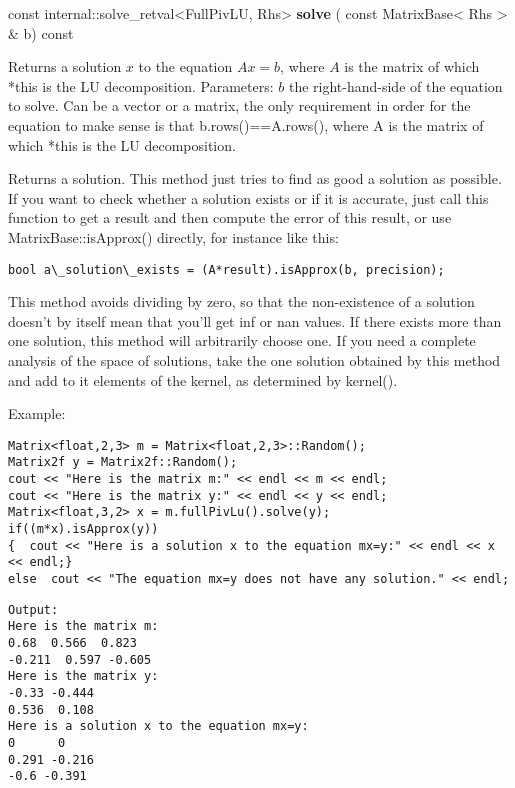 \vspace{0.3cm}
const internal::solve\_retval<FullPivLU, Rhs> \textbf{solve}  ( const MatrixBase< Rhs > \&  b)  const 

Returns a solution $x$ to the equation $Ax=b$, where $A$ is the matrix of which *this is the LU decomposition.
Parameters: $b$ the right-hand-side of the equation to solve. Can be a vector or a matrix, the only requirement in order for the equation to make sense is that b.rows()==A.rows(), where A is the matrix of which *this is the LU decomposition. 

Returns a solution. This method just tries to find as good a solution as possible. If you want to check whether a solution exists or if it is accurate, just call this function to get a result and then compute the error of this result, or use MatrixBase::isApprox() directly, for instance like this:

\begin{verbatim}
bool a\_solution\_exists = (A*result).isApprox(b, precision); 
\end{verbatim}

This method avoids dividing by zero, so that the non-existence of a solution doesn't by itself mean that you'll get inf or nan values.
If there exists more than one solution, this method will arbitrarily choose one. If you need a complete analysis of the space of solutions, take the one solution obtained by this method and add to it elements of the kernel, as determined by kernel().



Example:
\begin{lstlisting}
Matrix<float,2,3> m = Matrix<float,2,3>::Random();
Matrix2f y = Matrix2f::Random();
cout << "Here is the matrix m:" << endl << m << endl;
cout << "Here is the matrix y:" << endl << y << endl;
Matrix<float,3,2> x = m.fullPivLu().solve(y);
if((m*x).isApprox(y))
{  cout << "Here is a solution x to the equation mx=y:" << endl << x << endl;}
else  cout << "The equation mx=y does not have any solution." << endl;
\end{lstlisting}

\begin{verbatim}
Output:
Here is the matrix m:
0.68  0.566  0.823
-0.211  0.597 -0.605
Here is the matrix y:
-0.33 -0.444
0.536  0.108
Here is a solution x to the equation mx=y:
0      0
0.291 -0.216
-0.6 -0.391

\end{verbatim}

